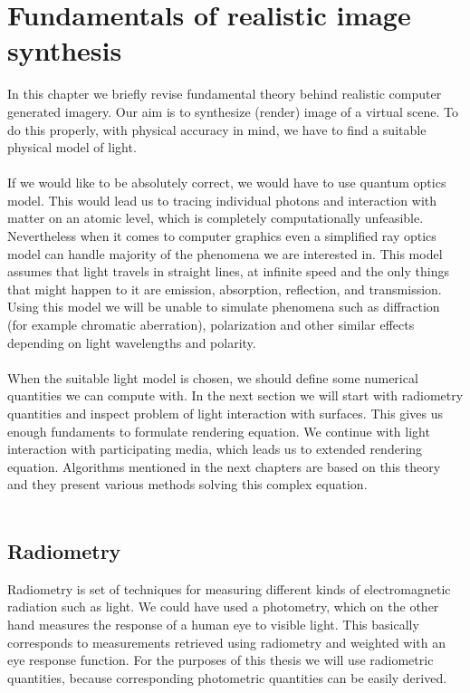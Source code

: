 \chapter{Fundamentals of realistic image synthesis}
\label{ch:2}
In this chapter we briefly revise fundamental theory behind realistic computer generated imagery. Our aim is to synthesize (render) image of a virtual scene. To do this properly, with physical accuracy in mind, we have to find a suitable physical model of light.
\\
\\
If we would like to be absolutely correct, we would have to use quantum optics model. This would lead us to tracing individual photons and interaction with matter on an atomic level, which is completely computationally unfeasible. Nevertheless when it comes to computer graphics even a simplified ray optics model can handle majority of the phenomena we are interested in. This model assumes that light travels in straight lines, at infinite speed and the only things that might happen to it are emission, absorption, reflection, and transmission. Using this model we will be unable to simulate phenomena such as diffraction (for example chromatic aberration), polarization and other similar effects depending on light wavelengths and polarity.
\\
\\
When the suitable light model is chosen, we should define some numerical quantities we can compute with. In the next section we will start with radiometry quantities and inspect problem of light interaction with surfaces. This gives us enough fundaments to formulate rendering equation. We continue with light interaction with participating media, which leads us to extended rendering equation. Algorithms mentioned in the next chapters are based on this theory and they present various methods solving this complex equation.
\\
\\
\section{Radiometry}

Radiometry is set of techniques for measuring different kinds of electromagnetic radiation such as light. We could have used a photometry, which on the other hand measures the response of a human eye to visible light. This basically corresponds to measurements retrieved using radiometry and weighted with an eye response function. For the purposes of this thesis we will use radiometric quantities, because corresponding photometric quantities can be easily derived.

